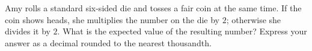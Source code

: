Amy rolls a standard six-sided die and tosses a fair coin at the same time. If the coin shows heads, she multiplies the number on the die by $2$; otherwise she divides it by $2$. What is the expected value of the resulting number? Express your answer as a decimal rounded to the nearest thousandth.
